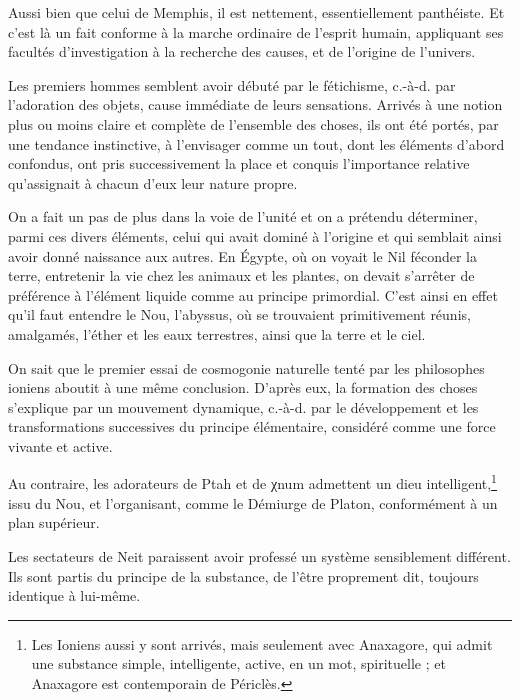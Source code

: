 \documentclass[a4paper, 11pt, oneside]{article}
\begin{document}
Aussi bien que celui de Memphis, il est nettement, essentiellement panthéiste. Et c'est là un fait conforme à la marche ordinaire de l'esprit humain, appliquant ses facultés d'investigation à la recherche des causes, et de l'origine de l'univers.

Les premiers hommes semblent avoir débuté par le fétichisme, c.-à-d. par l'adoration des objets, cause immédiate de leurs sensations. Arrivés à une notion plus ou moins claire et complète de l'ensemble des choses, ils ont été portés, par une tendance instinctive, à l'envisager comme un tout, dont les éléments d'abord confondus, ont pris successivement la place et conquis l'importance relative qu'assignait à chacun d'eux leur nature propre.

On a fait un pas de plus dans la voie de l'unité et on a prétendu déterminer, parmi ces divers éléments, celui qui avait dominé à l'origine et qui semblait ainsi avoir donné naissance aux autres. En Égypte, où on voyait le Nil féconder la terre, entretenir la vie chez les animaux et les plantes, on devait s'arrêter de préférence à l'élément liquide comme au principe primordial. C'est ainsi en effet qu'il faut entendre le Nou, l'abyssus, où se trouvaient primitivement réunis, amalgamés, l'éther et les eaux terrestres, ainsi que la terre et le ciel.

On sait que le premier essai de cosmogonie naturelle tenté par les philosophes ioniens aboutit à une même conclusion. D'après eux, la formation des choses s'explique par un mouvement dynamique, c.-à-d. par le développement et les transformations successives du principe élémentaire, considéré comme une force vivante et active.

Au contraire, les adorateurs de Ptah et de χnum admettent un dieu intelligent,\footnote{Les Ioniens aussi y sont arrivés, mais seulement avec Anaxagore, qui admit une substance simple, intelligente, active, en un mot, spirituelle ; et Anaxagore est contemporain de Périclès.} issu du Nou, et l'organisant, comme le Démiurge de Platon, conformément à un plan supérieur.

Les sectateurs de Neit paraissent avoir professé un système sensiblement différent. Ils sont partis du principe de la substance, de l'être proprement dit, toujours identique à lui-même.
\end{document}
